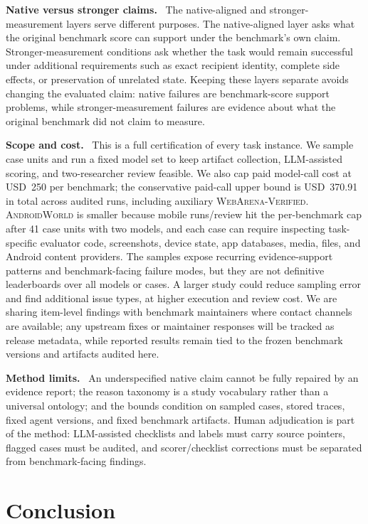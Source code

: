 \documentclass{article}
\newcommand{\webarena}{\textsc{WebArena-Verified}\xspace}
\newcommand{\androidworld}{\textsc{AndroidWorld}\xspace}
\newcommand{\paperupdate}[1]{\textcolor{revisionblue}{#1}}
\newcommand{\runin}[1]{\noindent\textbf{#1}\ }
\begin{document}
\runin{Native versus stronger claims.}
The native-aligned and stronger-measurement layers serve different purposes.
The native-aligned layer asks what the original benchmark score can support
under the benchmark's own claim. Stronger-measurement
conditions ask whether the task would remain successful under additional
requirements such as exact recipient identity, complete side effects, or
preservation of unrelated state. Keeping
these layers separate avoids changing the evaluated claim: native failures are
benchmark-score support problems, while stronger-measurement failures are
evidence about what the original benchmark did not claim to measure.

\runin{Scope and cost.}
\paperupdate{This is a full certification of every task instance.} We sample
case units and run a fixed model set to keep artifact
collection, LLM-assisted scoring, and
two-researcher review feasible. We also cap paid model-call cost at USD~250 per
benchmark; the conservative paid-call upper bound is USD~370.91 in
total across audited runs, including auxiliary \webarena.
\androidworld is smaller because mobile runs/review hit the per-benchmark cap
after 41 case units with two models, and each case can require inspecting
task-specific evaluator code, screenshots, device state, app databases, media,
files, and Android content providers. The samples expose
recurring evidence-support patterns and benchmark-facing failure modes, but
they are not definitive leaderboards over all models or cases. A larger study
could reduce sampling error and find additional issue types, at
higher execution and review cost. We are sharing item-level
findings with benchmark maintainers where contact channels are available; any
upstream fixes or maintainer responses will be tracked as release metadata,
while reported results remain tied to the frozen benchmark versions and
artifacts audited here.

\runin{Method limits.}
An underspecified native claim cannot be fully repaired by an evidence report; the reason
taxonomy is a study vocabulary rather than a universal ontology; and the bounds
condition on sampled cases, stored traces, fixed agent versions, and fixed
benchmark artifacts. Human adjudication is part of the method: LLM-assisted
checklists and labels must carry source pointers, flagged cases must be audited,
and scorer/checklist corrections must be separated from benchmark-facing
findings.

\section{Conclusion}
\end{document}
